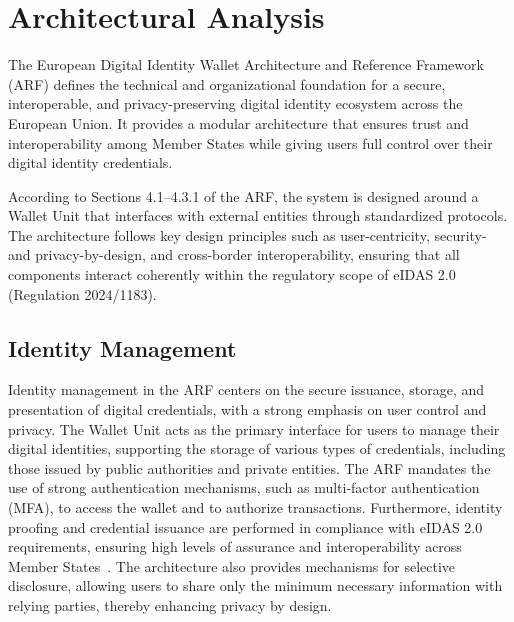 \documentclass[sigconf,balance,nonacm,authordraft]{acmart}
\begin{document}
\section{Architectural Analysis}
\label{sec:ArchitecturalAnalysis}
The European Digital Identity Wallet Architecture and Reference Framework (ARF) defines the technical and organizational foundation for a secure, interoperable, and privacy-preserving digital identity ecosystem across the European Union.
It provides a modular architecture that ensures trust and interoperability among Member States while giving users full control over their digital identity credentials.

According to Sections 4.1–4.3.1 of the ARF, the system is designed around a Wallet Unit that interfaces with external entities through standardized protocols.
The architecture follows key design principles such as user-centricity, security- and privacy-by-design, and cross-border interoperability, ensuring that all components interact coherently within the regulatory scope of eIDAS 2.0 (Regulation 2024/1183).

\subsection{Identity Management}
Identity management in the ARF centers on the secure issuance, storage, and presentation of digital credentials, with a strong emphasis on user control and privacy. The Wallet Unit acts as the primary interface for users to manage their digital identities, supporting the storage of various types of credentials, including those issued by public authorities and private entities. The ARF mandates the use of strong authentication mechanisms, such as multi-factor authentication (MFA), to access the wallet and to authorize transactions. Furthermore, identity proofing and credential issuance are performed in compliance with eIDAS 2.0 requirements, ensuring high levels of assurance and interoperability across Member States~\cite{EU_ARF2024,EU_eIDAS2024}. The architecture also provides mechanisms for selective disclosure, allowing users to share only the minimum necessary information with relying parties, thereby enhancing privacy by design.
\end{document}
